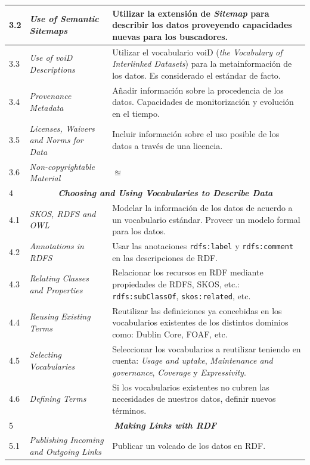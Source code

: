 \begin{longtable}[c]{|l|p{6.5cm}|p{7.5cm}|}
   3.2 &  \textit{Use of Semantic Sitemaps} & Utilizar la extensión de \textit{Sitemap} para describir los datos proveyendo capacidades nuevas para los buscadores. \\ \hline
   3.3 &  \textit{Use of voiD Descriptions} & Utilizar el vocabulario voiD (\textit{the Vocabulary of Interlinked Datasets}) para la metainformación de los datos. Es considerado el estándar de facto. \\ \hline
   3.4 &  \textit{Provenance Metadata} & Añadir información sobre la procedencia de los datos. Capacidades de monitorización y evolución en el tiempo. \\ \hline
   3.5 &  \textit{Licenses, Waivers and Norms for Data} & Incluir información sobre el uso posible de los datos a través de una licencia. \\ \hline
   3.6 &  \textit{Non-copyrightable Material} & $\approxeq$ \\ \hline
   4&\multicolumn{2}{|c|}{\textbf{\textit{Choosing and Using Vocabularies to Describe Data}}}\\ \hline
   4.1 &  \textit{\gls{SKOS}, RDFS and \gls{OWL}} &  Modelar la información de los datos de acuerdo a un vocabulario estándar. Proveer un modelo formal para los datos.\\ \hline
   4.2 &  \textit{Annotations in RDFS} &  Usar las anotaciones \texttt{rdfs:label} y \texttt{rdfs:comment} en las descripciones de RDF.\\ \hline
   4.3 &  \textit{Relating Classes and Properties} &  Relacionar los recursos en RDF mediante propiedades de RDFS, SKOS, etc.: \texttt{rdfs:subClassOf}, \texttt{skos:related}, etc.  \\ \hline
   4.4 &  \textit{Reusing Existing Terms} & Reutilizar las definiciones ya concebidas en los vocabularios existentes de los distintos dominios como: Dublin Core, FOAF, etc. \\ \hline
   4.5 &  \textit{Selecting Vocabularies} & Seleccionar los vocabularios a reutilizar teniendo en cuenta: \textit{Usage and uptake}, \textit{Maintenance and governance}, \textit{Coverage} y \textit{Expressivity}.\\ \hline
   4.6 &  \textit{Defining Terms} &  Si los vocabularios existentes no cubren las necesidades de nuestros datos, definir nuevos términos.\\ \hline
   5&\multicolumn{2}{|c|}{\textbf{\textit{Making Links with RDF}}}\\ \hline
   5.1 &  \textit{Publishing Incoming and Outgoing Links} &  Publicar un volcado de los datos en RDF.\\ \hline

\end{longtable}
